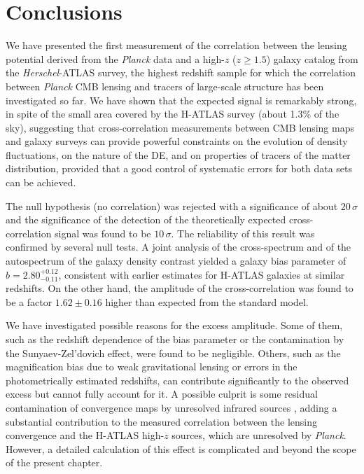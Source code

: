 \section{Conclusions}
\label{sec:conclusionsxc1}
We have presented the first measurement of the correlation between the lensing potential derived from the \emph{Planck} data and a high-$z$ ($z\ge 1.5$) galaxy catalog from the \emph{Herschel}-ATLAS survey, the highest redshift sample for which the correlation between \emph{Planck} \gls{CMB} lensing and tracers of large-scale structure has been investigated so far.
We have shown that the expected signal is remarkably strong, in spite of the small area covered by the H-ATLAS survey (about 1.3\% of the sky), suggesting that cross-correlation measurements between \gls{CMB} lensing maps and galaxy surveys can provide powerful constraints on the evolution of density fluctuations, on the nature of the \gls{DE}, and on properties of tracers of the matter distribution, provided that a good control of systematic errors  for both data sets can be achieved.

The null hypothesis (no correlation) was rejected with a significance of about $20\,\sigma$ and the significance of the detection of the theoretically expected cross-correlation signal was found to be $10\,\sigma$. The reliability of this result was confirmed by several null tests. A joint analysis of the cross-spectrum and of the autospectrum of the galaxy density contrast yielded a galaxy bias parameter of $b=2.80^{+0.12}_{-0.11}$, consistent with earlier estimates for H-ATLAS galaxies at similar redshifts. On the other hand, the amplitude of the cross-correlation was found to be a factor $1.62 \pm 0.16$ higher than expected from the standard model.

We have investigated possible reasons for the excess amplitude. Some of them, such as the redshift dependence of the bias parameter or the contamination by the Sunyaev-Zel'dovich effect, were found to be negligible. Others, such as the magnification bias due to weak gravitational lensing or errors in the photometrically estimated redshifts, can contribute significantly to the observed excess but cannot fully account for it. A possible culprit is some residual contamination of convergence maps by unresolved infrared sources \citep{Osborne2014,VanEngelen2014}, adding a substantial contribution to the measured correlation between the lensing convergence and the H-ATLAS high-$z$ sources, which are unresolved by \emph{Planck}. However, a detailed calculation of this effect is complicated and beyond the scope of the present chapter.

